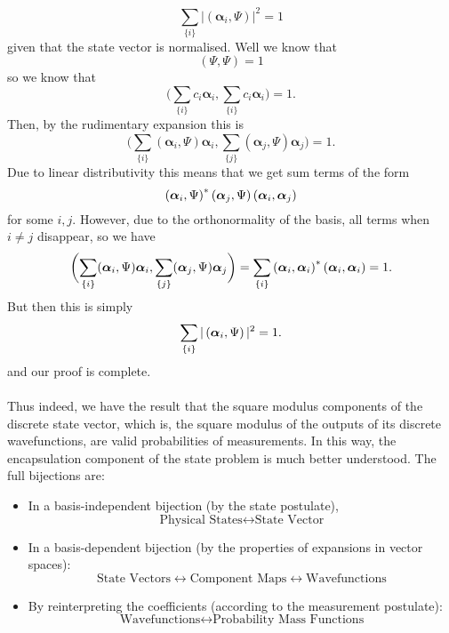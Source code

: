 $$
\sum_{\{i\}}|(\bm{\alpha}_{i},\Psi)|^2=1
$$
given that the state vector is normalised. Well we know that 
$$
(\Psi,\Psi)=1
$$
so we know that 
$$
\biggl(\sum_{\{i\}}c_{i}\bm{\alpha}_{i},\sum_{\{i\}}c_{i}\bm{\alpha}_{i}\biggr)=1.
$$
Then, by the rudimentary expansion this is 
$$
\biggl(\sum_{\{i\}}(\bm{\alpha}_{i},\Psi)\bm{\alpha}_{i},\sum_{\{j\}}(\bm{\alpha}_{j},\Psi)\bm{\alpha}_{j}\biggr)=1.
$$
Due to linear distributivity this means that we get sum terms of the form
$$
\left(\bm{\alpha}_{i},\Psi\right)^{\ast}\left(\bm{\alpha}_{j},\Psi\right)\left(\bm{\alpha}_{i},\bm{\alpha}_{j}\right)
$$
for some $i,j$. However, due to the orthonormality of the basis, all terms when $i\neq j$ disappear, so we have 
$$
\biggl(\sum_{\{i\}}(\bm{\alpha}_{i},\Psi)\bm{\alpha}_{i},\sum_{\{j\}}(\bm{\alpha}_{j},\Psi)\bm{\alpha}_{j}\biggr)=\sum_{\{i\}}\left(\bm{\alpha}_{i},\bm{\alpha}_{i}\right)^{\ast}\left(\bm{\alpha}_{i},\bm{\alpha}_{i}\right)=1.
$$
But then this is simply
$$
\sum_{\{i\}}|\left(\bm{\alpha}_{i},\Psi\right)|^2=1.
$$
and our proof is complete.
\\\\
Thus indeed, we have the result that the square modulus components of the discrete state vector, which is, the square modulus of the outputs of its discrete wavefunctions, are valid probabilities of measurements. In this way, the encapsulation component of the state problem is much better understood. The full bijections are:
\begin{itemize}
    \item In a basis-independent bijection (by the state postulate),
    $$
    \text{Physical States} \leftrightarrow \text{State Vector}
    $$    
    \item In a basis-dependent bijection (by the properties of expansions in vector spaces):
    $$
    \text{State Vectors} \leftrightarrow \text{Component Maps}\leftrightarrow\text{Wavefunctions}
    $$
    \item By reinterpreting the coefficients (according to the measurement postulate):
    $$
    \text{Wavefunctions} \leftrightarrow \text{Probability Mass Functions} 
    $$
\end{itemize}
